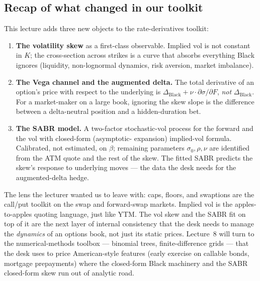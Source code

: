 \subsection{Recap of what changed in our toolkit}\label{L7-sec:tk}

This lecture adds three new objects to the rate-derivatives toolkit:

\begin{enumerate}[label=(\arabic*)]
  \item \textbf{The volatility skew} as a first-class observable. Implied
        vol is not constant in $K$; the cross-section across strikes is
        a curve that absorbs everything Black ignores (liquidity,
        non-lognormal dynamics, risk aversion, market imbalance).
  \item \textbf{The Vega channel and the augmented delta.} The total
        derivative of an option's price with respect to the underlying
        is $\Delta_{\text{Black}} + \nu \cdot \partial\sigma/\partial F$,
        \emph{not} $\Delta_{\text{Black}}$. For a market-maker on a
        large book, ignoring the skew slope is the difference between
        a delta-neutral position and a hidden-duration bet.
  \item \textbf{The SABR model.} A two-factor stochastic-vol process
        for the forward and the vol with closed-form (asymptotic-
        expansion) implied-vol formula. Calibrated, not estimated,
        on $\beta$; remaining parameters $\sigma_0, \rho, \nu$ are
        identified from the ATM quote and the rest of the skew. The
        fitted SABR predicts the skew's response to underlying
        moves --- the data the desk needs for the augmented-delta
        hedge.
\end{enumerate}

The lens the lecturer wanted us to leave with: caps, floors, and
swaptions are the call/put toolkit on the swap and forward-swap
markets. Implied vol is the apples-to-apples quoting language, just
like YTM. The vol skew and the SABR fit on top of it are the next
layer of internal consistency that the desk needs to manage the
\emph{dynamics} of an options book, not just its static prices.
Lecture~8 will turn to the numerical-methods toolbox --- binomial
trees, finite-difference grids --- that the desk uses to price
American-style features (early exercise on callable bonds,
mortgage prepayments) where the closed-form Black machinery and
the SABR closed-form skew run out of analytic road.
